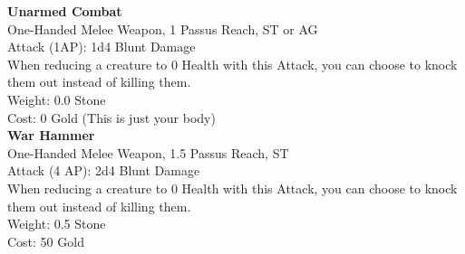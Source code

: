 \textbf{Unarmed Combat}\\
One-Handed Melee Weapon, 1 Passus Reach, ST or AG\\
Attack (1AP): 1d4 Blunt Damage\\
When reducing a creature to 0 Health with this Attack, you can choose to knock them out instead of killing them.\\
Weight: 0.0 Stone\\
Cost: 0 Gold (This is just your body)\\


\textbf{War Hammer}\\
One-Handed Melee Weapon, 1.5 Passus Reach, ST\\
Attack (4 AP): 2d4 Blunt Damage\\
When reducing a creature to 0 Health with this Attack, you can choose to knock them out instead of killing them.\\
Weight: 0.5 Stone\\
Cost: 50 Gold\\